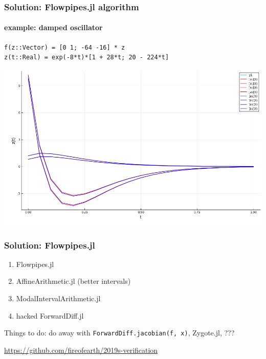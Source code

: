 \documentclass{beamer}
\begin{document}

\begin{frame}[fragile]
    \frametitle{Solution: Flowpipes.jl algorithm}
    \framesubtitle{example: damped oscillator}

\begin{verbatim}
f(z::Vector) = [0 1; -64 -16] * z
z(t::Real) = exp(-8*t)*[1 + 28*t; 20 - 224*t]
\end{verbatim}

    \includegraphics[width=1.0\textheight]{oscillator.png}

\end{frame}


\begin{frame}
    \frametitle{Solution: Flowpipes.jl}

    \vspace{5mm}
    \begin{enumerate}
        \item Flowpipes.jl
        \item AffineArithmetic.jl (better intervals)
        \item ModalIntervalArithmetic.jl
        \item hacked ForwardDiff.jl
    \end{enumerate}

    \vspace{5mm}
    Things to do: do away with \texttt{ForwardDiff.jacobian(f, x)}, Zygote.jl, ???

    \vspace{5mm}
    \url{https://github.com/fireofearth/2019s-verification}

\end{frame}
\end{document}
